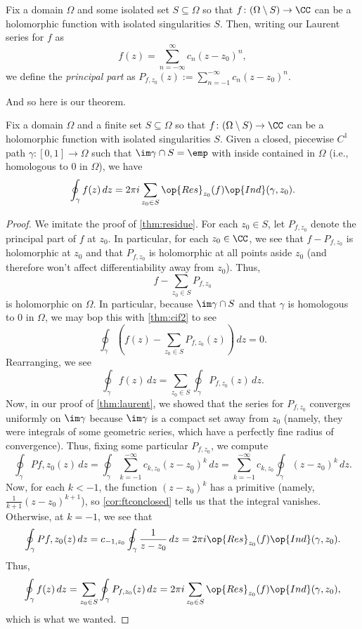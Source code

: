 \begin{definition}[Residue]
	Fix a domain $\Omega$ and some isolated set $S\subseteq\Omega$ so that $f\colon(\Omega\setminus S)\to\CC$ can be a holomorphic function with isolated singularities $S$. Then, writing our Laurent series for $f$ as
	\[f(z)=\sum_{n=-\infty}^\infty c_n(z-z_0)^n,\]
	we define the \textit{principal part} as $P_{f,z_0}(z):=\sum_{n=-1}^{-\infty} c_n(z-z_0)^n$.
\end{definition}
And so here is our theorem.
\begin{theorem}[Residue] \label{thm:residue2}
	Fix a domain $\Omega$ and a finite set $S\subseteq\Omega$ so that $f\colon(\Omega\setminus S)\to\CC$ can be a holomorphic function with isolated singularities $S$. Given a closed, piecewise $C^1$ path $\gamma\colon[0,1]\to\Omega$ such that $\im\gamma\cap S=\emp$ with inside contained in $\Omega$ (i.e., homologous to $0$ in $\Omega$), we have
	\[\oint_\gamma f(z)\,dz=2\pi i\sum_{z_0\in S}\op{Res}_{z_0}(f)\op{Ind}(\gamma,z_0).\]
\end{theorem}
\begin{proof}
	We imitate the proof of \autoref{thm:residue}. For each $z_0\in S$, let $P_{f,z_0}$ denote the principal part of $f$ at $z_0$. In particular, for each $z_0\in\CC$, we see that $f-P_{f,z_0}$ is holomorphic at $z_0$ and that $P_{f,z_0}$ is holomorphic at all points aside $z_0$ (and therefore won't affect differentiability away from $z_0$). Thus,
	\[f-\sum_{z_0\in S}P_{f,z_0}\]
	is holomorphic on $\Omega$. In particular, because $\im\gamma\cap S$ and that $\gamma$ is homologous to $0$ in $\Omega$, we may bop this with \autoref{thm:cif2} to see
	\[\oint_\gamma\left(f(z)-\sum_{z_0\in S}P_{f,z_0}(z)\right)\,dz=0.\]
	Rearranging, we see
	\[\oint_\gamma f(z)\,dz=\sum_{z_0\in S}\oint_\gamma P_{f,z_0}(z)\,dz.\]
	Now, in our proof of \autoref{thm:laurent}, we showed that the series for $P_{f,z_0}$ converges uniformly on $\im\gamma$ because $\im\gamma$ is a compact set away from $z_0$ (namely, they were integrals of some geometric series, which have a perfectly fine radius of convergence). Thus, fixing some particular $P_{f,z_0}$, we compute
	\[\oint_\gamma P{f,z_0}(z)\,dz = \oint_\gamma\sum_{k=-1}^{-\infty}c_{k,z_0}(z-z_0)^k\,dz = \sum_{k=-1}^{-\infty}c_{k,z_0}\oint_\gamma (z-z_0)^k\,dz.\]
	Now, for each $k<-1$, the function $(z-z_0)^k$ has a primitive (namely, $\frac1{k+1}(z-z_0)^{k+1}$), so \autoref{cor:ftconclosed} tells us that the integral vanishes. Otherwise, at $k=-1$, we see that
	\[\oint_\gamma P{f,z_0}(z)\,dz = c_{-1,z_0}\oint_\gamma\frac1{z-z_0}\,dz=2\pi i\op{Res}_{z_0}(f)\op{Ind}(\gamma,z_0).\]
	Thus,
	\[\oint_\gamma f(z)\,dz=\sum_{z_0\in S}\oint_\gamma P_{f,z_0}(z)\,dz=2\pi  i\sum_{z_0\in S}\op{Res}_{z_0}(f)\op{Ind}(\gamma,z_0),\]
	which is what we wanted.
\end{proof}

